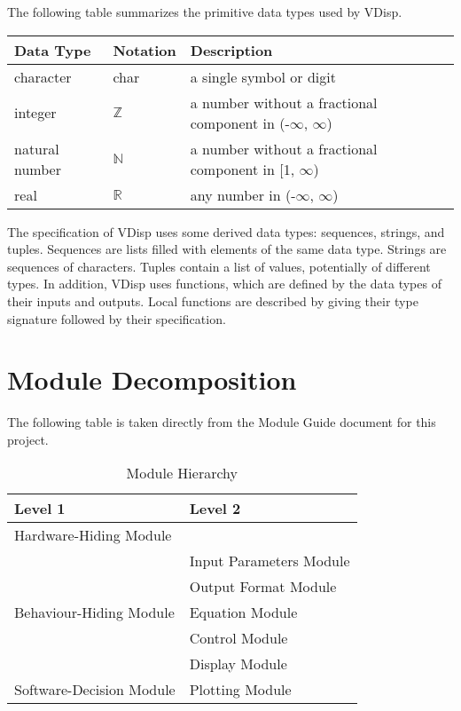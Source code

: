 \documentclass[12pt, titlepage]{article}
\begin{document}
The following table summarizes the primitive data types used by VDisp. 

\begin{center}
\renewcommand{\arraystretch}{1.2}
\noindent 
\begin{tabular}{l l p{7.5cm}} 
\toprule 
\textbf{Data Type} & \textbf{Notation} & \textbf{Description}\\ 
\midrule
character & char & a single symbol or digit\\
integer & $\mathbb{Z}$ & a number without a fractional component in (-$\infty$, $\infty$) \\
natural number & $\mathbb{N}$ & a number without a fractional component in [1, $\infty$) \\
real & $\mathbb{R}$ & any number in (-$\infty$, $\infty$)\\
\bottomrule
\end{tabular} 
\end{center}

\noindent
The specification of VDisp uses some derived data types: sequences, strings, and
tuples. Sequences are lists filled with elements of the same data type. Strings
are sequences of characters. Tuples contain a list of values, potentially of
different types. In addition, VDisp uses functions, which are defined by the
data types of their inputs and outputs. Local functions are described by giving
their type signature followed by their specification.

\section{Module Decomposition}

The following table is taken directly from the Module Guide document for this
project.

\begin{table}[h!]
\centering
\begin{tabular}{p{} p{}}
\toprule
\textbf{Level 1} & \textbf{Level 2}\\
\midrule

{Hardware-Hiding Module} & ~ \\
\midrule

\multirow{5}{0.3\textwidth}{Behaviour-Hiding Module} & Input Parameters Module\\
& Output Format Module\\
& Equation Module\\
& Control Module\\
& Display Module \\
\midrule

{Software-Decision Module} & Plotting Module\\
\bottomrule

\end{tabular}
\caption{Module Hierarchy}
\label{TblMH}
\end{table}
  
\end{document}
